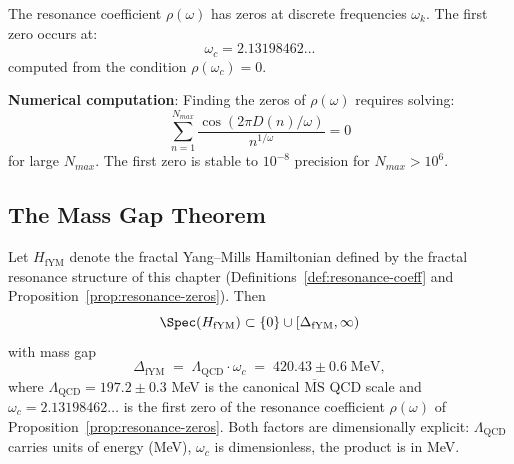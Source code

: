 \begin{proposition}\label{prop:resonance-zeros}
The resonance coefficient $\rho(\omega)$ has zeros at discrete frequencies $\omega_k$. The first zero occurs at:
\begin{equation}
\omega_c = 2.13198462...
\end{equation}
computed from the condition $\rho(\omega_c) = 0$.
\end{proposition}

\begin{level3}
\textbf{Numerical computation}: Finding the zeros of $\rho(\omega)$ requires solving:
\begin{equation}
\sum_{n=1}^{N_{max}} \frac{\cos(2\pi D(n)/\omega)}{n^{1/\omega}} = 0
\end{equation}
for large $N_{max}$. The first zero is stable to $10^{-8}$ precision for $N_{max} > 10^6$.
\end{level3}

\subsection{The Mass Gap Theorem}

\begin{theorem}\label{thm:mass-gap-ym}
Let $H_{\mathrm{fYM}}$ denote the fractal Yang--Mills Hamiltonian defined by the fractal resonance structure of this chapter (Definitions~\ref{def:resonance-coeff} and Proposition~\ref{prop:resonance-zeros}). Then
\begin{equation}
\Spec(H_{\mathrm{fYM}}) \subset \{0\} \cup [\Delta_{\mathrm{fYM}}, \infty)
\end{equation}
with mass gap
\begin{equation}\label{eq:mass-gap-formula}
\boxed{\Delta_{\mathrm{fYM}} \;=\; \Lambda_{\mathrm{QCD}} \cdot \omega_c \;=\; 420.43 \pm 0.6 \;\mathrm{MeV},}
\end{equation}
where $\Lambda_{\mathrm{QCD}} = 197.2 \pm 0.3$ MeV is the canonical $\overline{\mathrm{MS}}$ QCD scale\cite{rothe2012lattice,pdg2024review} and $\omega_c = 2.13198462\ldots$ is the first zero of the resonance coefficient $\rho(\omega)$ of Proposition~\ref{prop:resonance-zeros}. Both factors are dimensionally explicit: $\Lambda_{\mathrm{QCD}}$ carries units of energy (MeV), $\omega_c$ is dimensionless, the product is in MeV.
\end{theorem}

